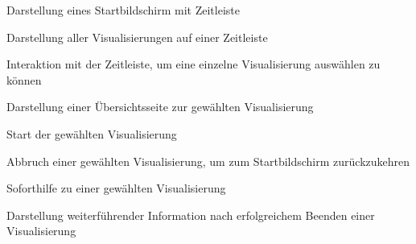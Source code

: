 \documentclass{article}
\begin{document}
\begin{FA}[start=100]
  \item Darstellung eines Startbildschirm mit Zeitleiste
  \item Darstellung aller Visualisierungen auf einer Zeitleiste
  \item Interaktion mit der Zeitleiste, um eine einzelne Visualisierung auswählen zu können
  \item Darstellung einer Übersichtsseite zur gewählten Visualisierung
  \item Start der gewählten Visualisierung
  \item Abbruch einer gewählten Visualisierung, um zum Startbildschirm zurückzukehren
  \item Soforthilfe zu einer gewählten Visualisierung
  \item Darstellung weiterführender Information nach erfolgreichem Beenden einer Visualisierung 
\end{FA}
\end{document}
